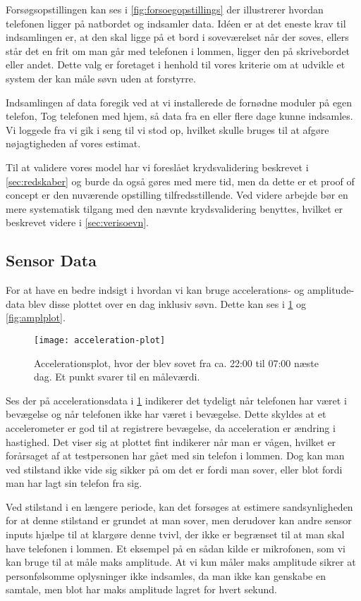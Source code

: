 Forsøgsopstillingen kan ses i \cref{fig:forsoegopstillings} der illustrerer hvordan telefonen ligger på natbordet og indsamler data.
Idéen er at det eneste krav til indsamlingen er, at den skal ligge på et bord i soveværelset når der soves, ellers står det en frit om man går med telefonen i lommen, ligger den på skrivebordet eller andet. 
Dette valg er foretaget i henhold til vores kriterie om at udvikle et system der kan måle søvn uden at forstyrre.

Indsamlingen af data foregik ved at vi installerede de fornødne moduler på egen telefon, Tog telefonen med hjem, så data fra en eller flere dage kunne indsamles.
Vi loggede fra vi gik i seng til vi stod op, hvilket skulle bruges til at afgøre nøjagtigheden af vores estimat.

Til at validere vores model har vi foreslået krydsvalidering beskrevet i \cref{sec:redskaber} og burde da også gøres med mere tid, men da dette er et proof of concept er den nuværende opstilling tilfredsstillende.
Ved videre arbejde bør en mere systematisk tilgang med den nævnte krydsvalidering benyttes, hvilket er beskrevet videre i \cref{sec:verisoevn}.

\subsection{Sensor Data}
For at have en bedre indsigt i hvordan vi kan bruge accelerations- og amplitude-data blev disse plottet over en dag inklusiv søvn.
Dette kan ses i \cref{fig:accplot} og \cref{fig:amplplot}.

\begin{figure}[h]
	\centering
	\texttt{[image: acceleration-plot]}
	\caption{Accelerationsplot, hvor der blev sovet fra ca. 22:00 til 07:00 næste dag.  Et punkt svarer til en måleværdi.}\label{fig:accplot}
\end{figure}

Ses der på accelerationsdata i \cref{fig:accplot} indikerer det tydeligt når telefonen har været i bevægelse og når telefonen ikke har været i bevægelse.
Dette skyldes at et accelerometer er god til at registrere bevægelse, da acceleration er ændring i hastighed.
Det viser sig at plottet fint indikerer når man er vågen, hvilket er forårsaget af at testpersonen har gået med sin telefon i lommen.
Dog kan man ved stilstand ikke vide sig sikker på om det er fordi man sover, eller blot fordi man har lagt sin telefon fra sig.

Ved stilstand i en længere periode, kan det forsøges at estimere sandsynligheden for at denne stilstand er grundet at man sover, men derudover kan andre sensor inputs hjælpe til at klargøre denne tvivl, der ikke er begrænset til at man skal have telefonen i lommen.
Et eksempel på en sådan kilde er mikrofonen, som vi kan bruge til at måle maks amplitude.
At vi kun måler maks amplitude sikrer at personfølsomme oplysninger ikke indsamles, da man ikke kan genskabe en samtale, men blot har maks amplitude lagret for hvert sekund.

